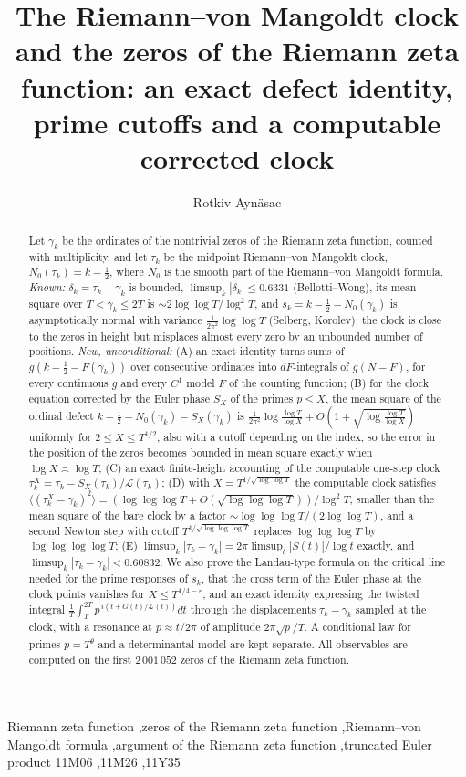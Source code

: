 \documentclass[preprint,12pt]{elsarticle}
\numberwithin{equation}{section}
\theoremstyle{plain}
\theoremstyle{definition}
\theoremstyle{remark}
\newcommand{\NO}{N_0}
\newcommand{\lL}{\mathcal L}
\begin{document}
\begin{frontmatter}
\title{The Riemann--von Mangoldt clock and the zeros of the Riemann zeta function: an exact defect identity, prime cutoffs and a computable corrected clock}
\author{Rotkiv Ayn\"asac}

\begin{abstract}
Let $\gamma_k$ be the ordinates of the nontrivial zeros of the Riemann zeta function, counted with multiplicity, and let $\tau_k$ be the midpoint Riemann--von Mangoldt clock, $\NO(\tau_k)=k-\frac12$, where $\NO$ is the smooth part of the Riemann--von Mangoldt formula. \emph{Known:} $\delta_k=\tau_k-\gamma_k$ is bounded, $\limsup_k|\delta_k|\le0.6331$ (Bellotti--Wong), its mean square over $T<\gamma_k\le2T$ is $\sim2\log\log T/\log^2T$, and $s_k=k-\frac12-\NO(\gamma_k)$ is asymptotically normal with variance $\frac1{2\pi^2}\log\log T$ (Selberg, Korolev): the clock is close to the zeros in height but misplaces almost every zero by an unbounded number of positions. \emph{New, unconditional:} (A) an exact identity turns sums of $g(k-\frac12-F(\gamma_k))$ over consecutive ordinates into $dF$-integrals of $g(N-F)$, for every continuous $g$ and every $C^1$ model $F$ of the counting function; (B) for the clock equation corrected by the Euler phase $S_X$ of the primes $p\le X$, the mean square of the ordinal defect $k-\frac12-\NO(\gamma_k)-S_X(\gamma_k)$ is $\frac1{2\pi^2}\log\frac{\log T}{\log X}+O(1+\sqrt{\log\frac{\log T}{\log X}})$ uniformly for $2\le X\le T^{1/2}$, also with a cutoff depending on the index, so the error in the position of the zeros becomes bounded in mean square exactly when $\log X\asymp\log T$; (C) an exact finite-height accounting of the computable one-step clock $\tau_k^X=\tau_k-S_X(\tau_k)/\lL(\tau_k)$; (D) with $X=T^{1/\sqrt{\log\log T}}$ the computable clock satisfies $\langle(\tau_k^X-\gamma_k)^2\rangle=(\log\log\log T+O(\sqrt{\log\log\log T}))/\log^2T$, smaller than the mean square of the bare clock by a factor $\sim\log\log\log T/(2\log\log T)$, and a second Newton step with cutoff $T^{1/\sqrt{\log\log\log T}}$ replaces $\log\log\log T$ by $\log\log\log\log T$; (E) $\limsup_k|\tau_k-\gamma_k|=2\pi\limsup_t|S(t)|/\log t$ exactly, and $\limsup_k|\tau_k-\gamma_k|<0.60832$. We also prove the Landau-type formula on the critical line needed for the prime responses of $s_k$, that the cross term of the Euler phase at the clock points vanishes for $X\le T^{1/4-\varepsilon}$, and an exact identity expressing the twisted integral $\frac1T\int_T^{2T}p^{\,i(t+G(t)/\lL(t))}dt$ through the displacements $\tau_k-\gamma_k$ sampled at the clock, with a resonance at $p\approx t/2\pi$ of amplitude $2\pi\sqrt p/T$. A conditional law for primes $p=T^\theta$ and a determinantal model are kept separate. All observables are computed on the first $2\,001\,052$ zeros of the Riemann zeta function.
\end{abstract}

\begin{keyword}
Riemann zeta function \sep zeros of the Riemann zeta function \sep Riemann--von Mangoldt formula \sep argument of the Riemann zeta function \sep truncated Euler product
\MSC[2020] 11M06 \sep 11M26 \sep 11Y35
\end{keyword}
\end{frontmatter}
\end{document}
